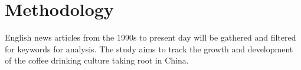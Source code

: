\section{Methodology}\label{sec:methodology}

English news articles from the 1990s to present day will be gathered and
filtered for keywords for analysis. The study aims to track the growth and
development of the coffee drinking culture taking root in China.
